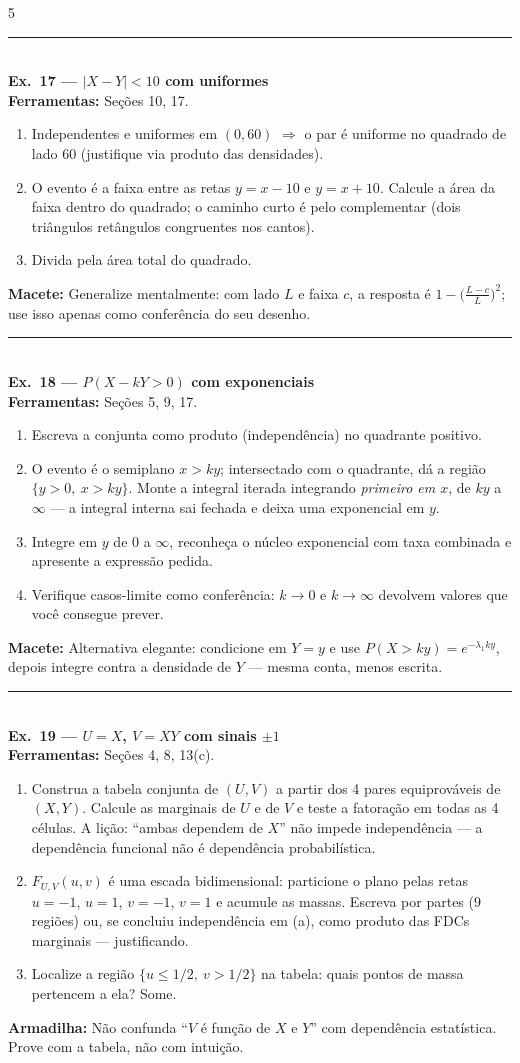 \documentclass[a4paper,8pt]{extarticle}
\newcommand{\tit}[1]{\vspace{2pt}\textcolor{azul}{\rule{\linewidth}{0.6pt}}\\[1pt]\textbf{\textcolor{azul}{#1}}\\[1pt]}
\newcommand{\mac}[1]{\textcolor{verde}{\textbf{Macete:}} #1\par}
\newcommand{\arm}[1]{\textcolor{vinho}{\textbf{Armadilha:}} #1\par}
\newcommand{\ferr}[1]{\textbf{Ferramentas:} #1\par}
\begin{document}
\begin{multicols*}{5}
\tit{Ex.\ 17 — $|X-Y|<10$ com uniformes}
\ferr{Seções 10, 17.}
\begin{enumerate}
\item Independentes e uniformes em $(0,60)$ $\Rightarrow$ o par é uniforme no quadrado de lado 60 (justifique via produto das densidades).
\item O evento é a faixa entre as retas $y=x-10$ e $y=x+10$. Calcule a área da faixa dentro do quadrado; o caminho curto é pelo complementar (dois triângulos retângulos congruentes nos cantos).
\item Divida pela área total do quadrado.
\end{enumerate}
\mac{Generalize mentalmente: com lado $L$ e faixa $c$, a resposta é $1-\big(\frac{L-c}{L}\big)^2$; use isso apenas como conferência do seu desenho.}

\tit{Ex.\ 18 — $P(X-kY>0)$ com exponenciais}
\ferr{Seções 5, 9, 17.}
\begin{enumerate}
\item Escreva a conjunta como produto (independência) no quadrante positivo.
\item O evento é o semiplano $x>ky$; intersectado com o quadrante, dá a região $\{y>0,\ x>ky\}$. Monte a integral iterada integrando \emph{primeiro em $x$}, de $ky$ a $\infty$ — a integral interna sai fechada e deixa uma exponencial em $y$.
\item Integre em $y$ de 0 a $\infty$, reconheça o núcleo exponencial com taxa combinada e apresente a expressão pedida.
\item Verifique casos-limite como conferência: $k\to0$ e $k\to\infty$ devolvem valores que você consegue prever.
\end{enumerate}
\mac{Alternativa elegante: condicione em $Y=y$ e use $P(X>ky)=e^{-\lambda_1 ky}$, depois integre contra a densidade de $Y$ — mesma conta, menos escrita.}

\tit{Ex.\ 19 — $U=X$, $V=XY$ com sinais $\pm1$}
\ferr{Seções 4, 8, 13(c).}
\begin{enumerate}
\item[(a)] Construa a tabela conjunta de $(U,V)$ a partir dos 4 pares equiprováveis de $(X,Y)$. Calcule as marginais de $U$ e de $V$ e teste a fatoração em todas as 4 células. A lição: “ambas dependem de $X$” não impede independência — a dependência funcional não é dependência probabilística.
\item[(b)] $F_{U,V}(u,v)$ é uma escada bidimensional: particione o plano pelas retas $u=-1$, $u=1$, $v=-1$, $v=1$ e acumule as massas. Escreva por partes (9 regiões) ou, se concluiu independência em (a), como produto das FDCs marginais — justificando.
\item[(c)] Localize a região $\{u\le 1/2,\ v>1/2\}$ na tabela: quais pontos de massa pertencem a ela? Some.
\end{enumerate}
\arm{Não confunda “$V$ é função de $X$ e $Y$” com dependência estatística. Prove com a tabela, não com intuição.}


\end{multicols*}
\end{document}
